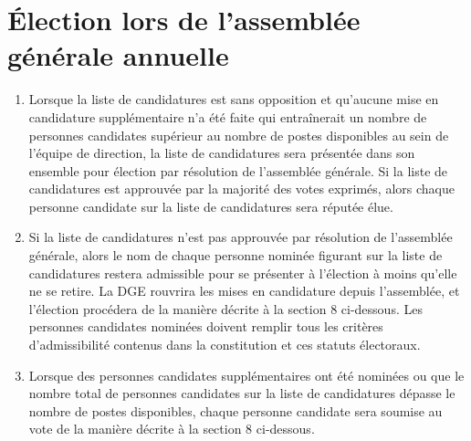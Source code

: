 \section{Élection lors de l'assemblée générale annuelle}
\label{election-lors-de-l-assemblee-generale-annuelle}

\begin{enumerate}
 \item Lorsque la liste de candidatures est sans opposition et qu'aucune mise en candidature supplémentaire n'a été faite qui entraînerait un nombre de personnes candidates supérieur au nombre de postes disponibles au sein de l'équipe de direction, la liste de candidatures sera présentée dans son ensemble pour élection par résolution de l'assemblée générale. Si la liste de candidatures est approuvée par la majorité des votes exprimés, alors chaque personne candidate sur la liste de candidatures sera réputée élue.
 \item Si la liste de candidatures n'est pas approuvée par résolution de l'assemblée générale, alors le nom de chaque personne nominée figurant sur la liste de candidatures restera admissible pour se présenter à l'élection à moins qu'elle ne se retire. La DGE rouvrira les mises en candidature depuis l'assemblée, et l'élection procédera de la manière décrite à la section 8 ci-dessous. Les personnes candidates nominées doivent remplir tous les critères d'admissibilité contenus dans la constitution et ces statuts électoraux.
 \item Lorsque des personnes candidates supplémentaires ont été nominées ou que le nombre total de personnes candidates sur la liste de candidatures dépasse le nombre de postes disponibles, chaque personne candidate sera soumise au vote de la manière décrite à la section 8 ci-dessous.
\end{enumerate}

